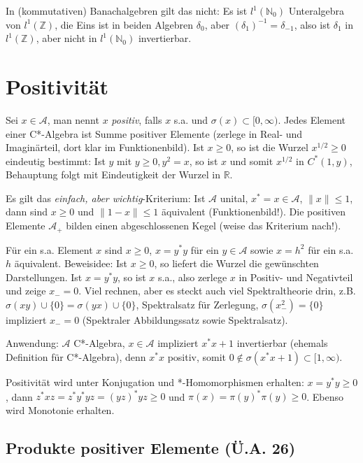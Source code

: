 \documentclass[11pt,a4paper]{scrartcl}
\newcommand{\N}{\mathbb{N}} %
\newcommand{\Z}{\mathbb{Z}} %
\newcommand{\R}{\mathbb{R}} %
\newcommand{\A}{\mathcal{A}}
\theoremstyle{plain}
\theoremstyle{definition}
\theoremstyle{remark}
\begin{document}
In (kommutativen) Banachalgebren gilt das nicht: Es ist $l^1(\N_0)$ Unteralgebra von $l^1(\Z)$, die Eins ist in beiden Algebren $\delta_0$, aber $(\delta_1)^{-1}=\delta_{-1}$, also ist $\delta_1$ in $l^1(\Z)$, aber nicht in $l^1(\N_0)$ invertierbar.

\section{Positivität}

Sei $x\in \A$, man nennt $x$ \emph{positiv}, falls $x$ s.a. und $\sigma(x) \subset [0,\infty)$. Jedes Element einer C*-Algebra ist Summe positiver Elemente (zerlege in Real- und Imaginärteil, dort klar im Funktionenbild). Ist $x \geq 0$, so ist die Wurzel $x^{1/2} \geq 0$ eindeutig bestimmt: Ist $y$ mit $y \geq 0, y^2=x$, so ist $x$ und somit $x^{1/2}$ in $C^*(1,y)$, Behauptung folgt mit Eindeutigkeit der Wurzel in $\R$.

Es gilt das \emph{einfach, aber wichtig}-Kriterium: Ist $\A$ unital, $x^*=x\in \A$, $\|x\| \leq 1$, dann sind $x\geq 0$ und $\|1-x\|\leq 1$ äquivalent (Funktionenbild!). Die positiven Elemente $\A_+$ bilden einen abgeschlossenen Kegel (weise das Kriterium nach!).

Für ein s.a. Element $x$ sind $x\geq 0$, $x=y^*y$ für ein $y\in \A$ sowie $x=h^2$ für ein s.a. $h$ äquivalent. Beweisidee: Ist $x \geq 0$, so liefert die Wurzel die gewünschten Darstellungen. Ist $x=y^*y$, so ist $x$ s.a., also zerlege $x$ in Positiv- und Negativteil und zeige $x_-=0$. Viel rechnen, aber es steckt auch viel Spektraltheorie drin, z.B. $\sigma(xy) \cup \{0\} = \sigma(yx) \cup \{0 \}$, Spektralsatz für Zerlegung, $\sigma(x_-^2)=\{0\}$ impliziert $x_-=0$ (Spektraler Abbildungssatz sowie Spektralsatz).

Anwendung: $\A$ C*-Algebra, $x\in \A$ impliziert $x^*x+1$ invertierbar (ehemals Definition für C*-Algebra), denn $x^*x$ positiv, somit $0\not\in \sigma(x^*x+1) \subset [1,\infty)$.

Positivität wird unter Konjugation und *-Homomorphismen erhalten: $x=y^*y\geq 0$, dann $z^*xz=z^*y^*yz=(yz)^*yz \geq0$ und $\pi(x)=\pi(y)^*\pi(y) \geq 0$. Ebenso wird Monotonie erhalten.

\subsection{Produkte positiver Elemente (Ü.A. 26)}
\end{document}
